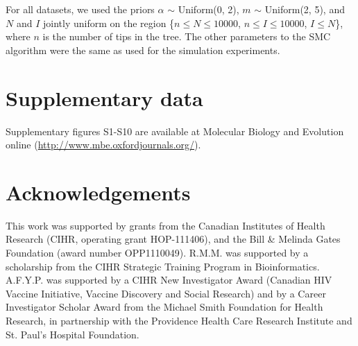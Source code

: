 \documentclass[nogrid]{MBE}
\begin{document}
For all datasets, we used the priors $\alpha$ $\sim$ Uniform(0, 2), $m$ $\sim$
Uniform(2, 5), and $N$ and $I$ jointly uniform on the region 
\{$n \leq N \leq 10000$, $n \leq I \leq 10000$, $I \leq N$\}, where $n$ is the
number of tips in the tree. The other parameters to the SMC algorithm
were the same as used for the simulation experiments.

\section{Supplementary data}

Supplementary figures S1-S10 are available at Molecular Biology and Evolution
online (\url{http://www.mbe.oxfordjournals.org/}).

\section{Acknowledgements}

This work was supported by grants from the Canadian Institutes of Health
Research (CIHR, operating grant HOP-111406), and the Bill \& Melinda Gates
Foundation (award number OPP1110049). R.M.M. was supported by a scholarship
from the CIHR Strategic Training Program in Bioinformatics. A.F.Y.P. was
supported by a CIHR New Investigator Award (Canadian HIV Vaccine Initiative,
Vaccine Discovery and Social Research) and by a Career Investigator Scholar
Award from the Michael Smith Foundation for Health Research, in partnership
with the Providence Health Care Research Institute and St. Paul's Hospital
Foundation.



\end{document}

